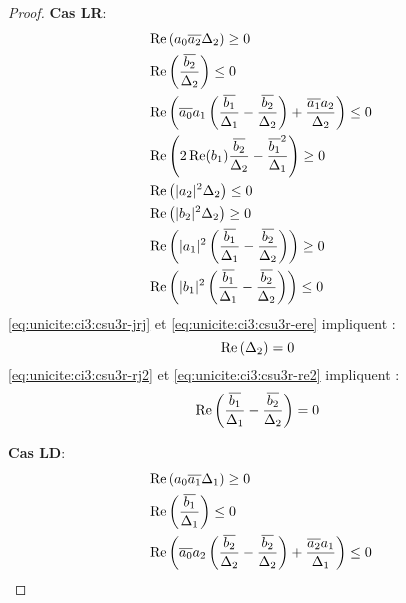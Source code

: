 \begin{proof}
    \begin{minipage}{0.49\textwidth}
      \textbf{Cas LR}:
      \begin{align}
        \label{eq:unicite:ci3:csu3r-j2}&\Re\left(a_0\conj{a_2}\Delta_2\right) \ge 0 \\
        \label{eq:unicite:ci3:csu3r-e2}&\Re\left(\frac{\conj{b_2}}{\Delta_2}\right) \le 0 \\
        \label{eq:unicite:ci3:csu3r-jdj}&\Re\left(\conj{a_0}a_1\left(\frac{\conj{b_1}}{\Delta_1}-\frac{\conj{b_2}}{\Delta_2}\right) + \frac{\conj{a_1}a_2}{\Delta_2} \right)\le 0\\
        \label{eq:unicite:ci3:csu3r-ede}&\Re\left(2\Re(b_1)\frac{\conj{b_2}}{\Delta_2}-\frac{\conj{b_1}^2}{\Delta_1}\right) \ge 0\\
        \label{eq:unicite:ci3:csu3r-jrj}&\Re\left(|a_2|^2\Delta_2\right) \le 0 \\
        \label{eq:unicite:ci3:csu3r-ere}&\Re\left(|b_2|^2\Delta_2\right) \ge 0 \\
        \label{eq:unicite:ci3:csu3r-rj2}&\Re\left(|a_1|^2\left(\frac{\conj{b_1}}{\Delta_1}-\frac{\conj{b_2}}{\Delta_2}\right)\right)\ge 0\\
        \label{eq:unicite:ci3:csu3r-re2}&\Re\left(|b_1|^2\left(\frac{\conj{b_1}}{\Delta_1}-\frac{\conj{b_2}}{\Delta_2}\right)\right)\le 0
      \end{align}
      \eqref{eq:unicite:ci3:csu3r-jrj} et \eqref{eq:unicite:ci3:csu3r-ere} impliquent :
      \begin{equation}
        \Re\left(\Delta_2\right) = 0\\\
      \end{equation}
      \eqref{eq:unicite:ci3:csu3r-rj2} et \eqref{eq:unicite:ci3:csu3r-re2} impliquent :
      \begin{equation}
        \Re\left(\frac{\conj{b_1}}{\Delta_1}-\frac{\conj{b_2}}{\Delta_2}\right) = 0\\\
      \end{equation}
    \end{minipage}
    \begin{minipage}{0.49\textwidth}
      \textbf{Cas LD}:
      \begin{align}
        \label{eq:unicite:ci3:csu3d-j2}&\Re\left(a_0\conj{a_1}\Delta_1\right) \ge 0 \\
        \label{eq:unicite:ci3:csu3d-e2}&\Re\left(\frac{\conj{b_1}}{\Delta_1}\right) \le 0 \\
        \label{eq:unicite:ci3:csu3d-jrj}&\Re\left(\conj{a_0}a_2\left(\frac{\conj{b_2}}{\Delta_2}-\frac{\conj{b_2}}{\Delta_2}\right) + \frac{\conj{a_2}a_1}{\Delta_1} \right)\le 0\\

\end{align}
\end{minipage}
\end{proof}
